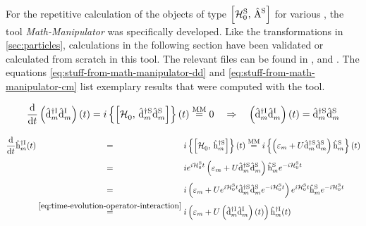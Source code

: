 For the repetitive calculation of the objects of type $\left[\HzeroHamiltonian[\schroedingerPicture],\, \Aop[\schroedingerPicture]\right]$ for various \Aop[\schroedingerPicture], the tool \emph{Math-Manipulator} was specifically developed. 
Like the transformations in \ref{sec:particles}, calculations in the following section have been validated or calculated from scratch in this tool.
The relevant files can be found in , and .
The equations \ref{eq:stuff-from-math-manipulator-dd} and \ref{eq:stuff-from-math-manipulator-cm} list exemplary results that were computed with the tool.

\begin{equation}
    \label{eq:stuff-from-math-manipulator-dd}
    \difft{}\left(\dop[\interactionPicture]{m}{\dagger}\dop[\interactionPicture]{m}{}\right)(t)
    = i \left\{\left[\HzeroHamiltonian[],\,\dop[\schroedingerPicture]{m}{\dagger}\dop[\schroedingerPicture]{m}{}\right]\right\}(t) \stackrel{\text{MM}}{=} 0 \quad \Rightarrow \quad \left(\dop[\interactionPicture]{m}{\dagger}\dop[\interactionPicture]{m}{}\right)(t) = \dop[\schroedingerPicture]{m}{\dagger}\dop[\schroedingerPicture]{m}{}
\end{equation}

\begin{equation}
    \label{eq:stuff-from-math-manipulator-cm}
    \begin{split}
        \difft{}\hopOfT[\interactionPicture]{m}{\dagger}
        &\stackrel{\phantom{\ref{eq:time-evolution-operator-interaction}}}{=} i \left\{\left[\HzeroHamiltonian[]{},\,\hop[\schroedingerPicture]{m}{\dagger}\right]\right\}(t) \stackrel{\text{MM}}{=} 
        i \left\{ \left(\epsl[m] + U \dop[\schroedingerPicture]{m}{\dagger}\dop[\schroedingerPicture]{m}{}\right)\hop[\schroedingerPicture]{m}{}\right\}(t)\\
        &\stackrel{\phantom{\ref{eq:time-evolution-operator-interaction}}}{=}i e^{i \HzeroHamiltonian[\schroedingerPicture]{} t} \left(\epsl[m] + U \dop[\schroedingerPicture]{m}{\dagger}\dop[\schroedingerPicture]{m}{}\right)\hop[\schroedingerPicture]{m}{}e^{-i \HzeroHamiltonian[\schroedingerPicture]{} t}\\
        &\stackrel{\phantom{\ref{eq:time-evolution-operator-interaction}}}{=}i \left(\epsl[m] + U e^{i \HzeroHamiltonian[\schroedingerPicture]{} t}\dop[\schroedingerPicture]{m}{\dagger}\dop[\schroedingerPicture]{m}{}e^{-i \HzeroHamiltonian[\schroedingerPicture]{} t}\right)e^{i \HzeroHamiltonian[\schroedingerPicture]{} t}\hop[\schroedingerPicture]{m}{}e^{-i \HzeroHamiltonian[\schroedingerPicture]{} t}\\
        &\stackrel{\ref{eq:time-evolution-operator-interaction}}{=}
        i \left(\epsl[m] + U \left(\dop[\interactionPicture]{m}{\dagger}\dop[\interactionPicture]{m}{}\right)(t)\right) \hopOfT[\interactionPicture]{m}{\dagger}\\
    \end{split}
\end{equation}

